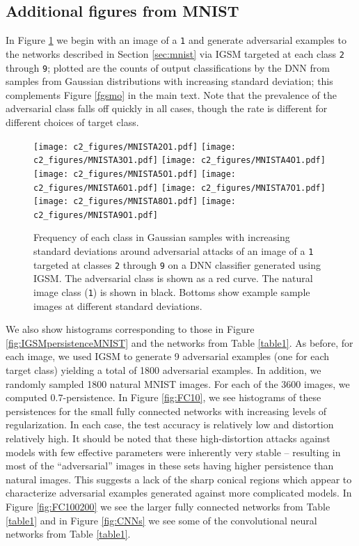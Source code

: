 \subsection{Additional figures from MNIST}
In Figure \ref{fig:mnistadv} we begin with an image of a \texttt{1} and generate adversarial examples to the networks described in Section \ref{sec:mnist} via IGSM targeted at each class \texttt{2} through \texttt{9}; plotted are the counts of output classifications by the DNN from samples from Gaussian distributions with increasing standard deviation; this complements Figure \ref{fgsmo} in the main text. Note that the prevalence of the adversarial class falls off quickly in all cases, though the rate is different for different choices of target class.
\begin{figure}[!htb]
    \centering
    \texttt{[image: c2\_figures/MNISTA2O1.pdf]}
    \texttt{[image: c2\_figures/MNISTA3O1.pdf]}
    \texttt{[image: c2\_figures/MNISTA4O1.pdf]}
    \texttt{[image: c2\_figures/MNISTA5O1.pdf]}
    \texttt{[image: c2\_figures/MNISTA6O1.pdf]}
    \texttt{[image: c2\_figures/MNISTA7O1.pdf]}
    \texttt{[image: c2\_figures/MNISTA8O1.pdf]}
    \texttt{[image: c2\_figures/MNISTA9O1.pdf]}
    \caption{Frequency of each class in Gaussian samples with increasing standard deviations around adversarial attacks of an image of a \texttt{1} targeted at classes \texttt{2} through \texttt{9} on a DNN classifier generated using IGSM. The adversarial class is shown as a red curve. The natural image class (\texttt{1}) is shown in black. Bottoms show example sample images at different standard deviations.}
    \label{fig:mnistadv}
\end{figure}

We also show histograms corresponding to those in Figure \ref{fig:IGSMpersistenceMNIST} and the networks from Table \ref{table1}.  As before, for each image, we used IGSM to generate 9 adversarial examples (one for each target class) yielding a total of 1800 adversarial examples. In addition, we randomly sampled 1800 natural MNIST images. For each of the 3600 images, we computed $0.7$-persistence. In Figure \ref{fig:FC10}, we see histograms of these persistences for the small fully connected networks with increasing levels of regularization. In each case, the test accuracy is relatively low and distortion relatively high. It should be noted that these high-distortion attacks against models with few effective parameters were inherently very stable -- resulting in most of the ``adversarial'' images in these sets having higher persistence than natural images. This suggests a lack of the sharp conical regions which appear to characterize adversarial examples generated against more complicated models.  In Figure \ref{fig:FC100200} we see the larger fully connected networks from Table \ref{table1} and in Figure \ref{fig:CNNs} we see some of the convolutional neural networks from Table \ref{table1}. 

